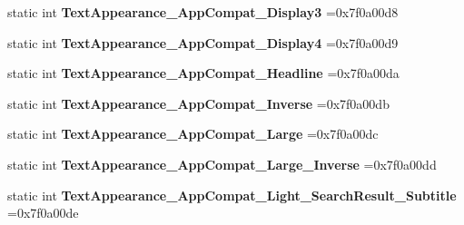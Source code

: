 \begin{DoxyCompactItemize}
\mbox{\label{classandroid_1_1support_1_1graphics_1_1drawable_1_1animated_1_1R_1_1style_ab6c35cdb5df56c378f2de7701fa1ff6f}} 
static int {\bfseries Text\+Appearance\+\_\+\+App\+Compat\+\_\+\+Display3} =0x7f0a00d8
\item 
\mbox{\label{classandroid_1_1support_1_1graphics_1_1drawable_1_1animated_1_1R_1_1style_aa17d6e9fbd4d437dc55c142d8eaf327a}} 
static int {\bfseries Text\+Appearance\+\_\+\+App\+Compat\+\_\+\+Display4} =0x7f0a00d9
\item 
\mbox{\label{classandroid_1_1support_1_1graphics_1_1drawable_1_1animated_1_1R_1_1style_a52f7933e956d8ffdff9953b5df5a2a90}} 
static int {\bfseries Text\+Appearance\+\_\+\+App\+Compat\+\_\+\+Headline} =0x7f0a00da
\item 
\mbox{\label{classandroid_1_1support_1_1graphics_1_1drawable_1_1animated_1_1R_1_1style_ab77450fa56c6804a607c6c0df32a7e16}} 
static int {\bfseries Text\+Appearance\+\_\+\+App\+Compat\+\_\+\+Inverse} =0x7f0a00db
\item 
\mbox{\label{classandroid_1_1support_1_1graphics_1_1drawable_1_1animated_1_1R_1_1style_a5df37012a5688df2378751c2fe9400b3}} 
static int {\bfseries Text\+Appearance\+\_\+\+App\+Compat\+\_\+\+Large} =0x7f0a00dc
\item 
\mbox{\label{classandroid_1_1support_1_1graphics_1_1drawable_1_1animated_1_1R_1_1style_a22f9495298a44512766d69bf7960b2fa}} 
static int {\bfseries Text\+Appearance\+\_\+\+App\+Compat\+\_\+\+Large\+\_\+\+Inverse} =0x7f0a00dd
\item 
\mbox{\label{classandroid_1_1support_1_1graphics_1_1drawable_1_1animated_1_1R_1_1style_ac98d0448743b8f14a6c98ca0c0635d69}} 
static int {\bfseries Text\+Appearance\+\_\+\+App\+Compat\+\_\+\+Light\+\_\+\+Search\+Result\+\_\+\+Subtitle} =0x7f0a00de

\end{DoxyCompactItemize}
